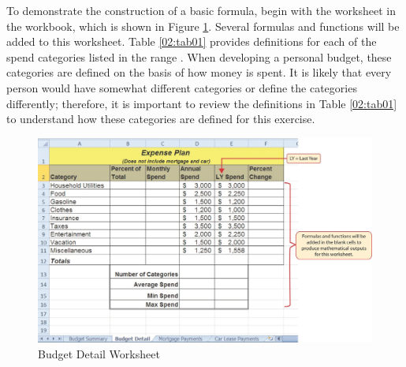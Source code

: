 To demonstrate the construction of a basic formula, begin with the  worksheet in the  workbook, which is shown in Figure \ref{02:fig02}. Several formulas and functions will be added to this worksheet. Table \ref{02:tab01} provides definitions for each of the spend categories listed in the range . When developing a personal budget, these categories are defined on the basis of how money is spent. It is likely that every person would have somewhat different categories or define the categories differently; therefore, it is important to review the definitions in Table \ref{02:tab01} to understand how these categories are defined for this exercise.

\begin{figure}[H]
	\centering
	\includegraphics[width=\maxwidth{.95\linewidth}]{gfx/ch02_fig02}
	\caption{Budget Detail Worksheet}
	\label{02:fig02}
\end{figure}

